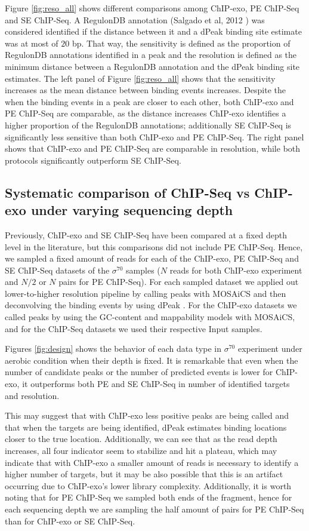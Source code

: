 \documentclass{bmcart}\usepackage[]{graphicx}\usepackage[]{color}
\newcommand{\sig}{\sigma^{70}}
\begin{document}
Figure \ref{fig:reso_all} shows different comparisons among ChIP-exo,
PE ChIP-Seq and SE ChIP-Seq. A RegulonDB annotation (Salgado et al,
2012 \cite{regulondb}) was considered identified if the distance
between it and a dPeak binding site estimate was at most of
$20$ bp. That way, the sensitivity is defined as the
proportion of RegulonDB annotations identified in a peak and the
resolution is defined as the minimum distance between a RegulonDB
annotation and the dPeak binding site estimates. The left panel of
Figure \ref{fig:reso_all} shows that the sensitivity increases as the
mean distance between binding events increases. Despite the when the
binding events in a peak are closer to each other, both ChIP-exo and
PE ChIP-Seq are comparable, as the distance increases ChIP-exo
identifies a higher proportion of the RegulonDB annotations;
additionally SE ChIP-Seq is significantly less sensitive than both
ChIP-exo and PE ChIP-Seq. The right panel shows that ChIP-exo and PE
ChIP-Seq are comparable in resolution, while both protocols
significantly outperform SE ChIP-Seq.

\subsection{Systematic comparison of ChIP-Seq vs ChIP-exo under
  varying sequencing depth}

Previously, ChIP-exo and SE ChIP-Seq have been compared at a fixed
depth level in the literature, but this comparisons did not include PE
ChIP-Seq. Hence, we sampled a fixed amount of reads for each of the
ChIP-exo, PE ChIP-Seq and SE ChIP-Seq datasets of the $\sig$ samples
($N$ reads for both ChIP-exo experiment and $N/2$ or $N$ pairs for PE
ChIP-Seq). For each sampled dataset we applied out lower-to-higher
resolution pipeline by calling peaks with MOSAiCS \cite{mosaics} and
then deconvolving the binding events by using dPeak \cite{dpeak}. For
the ChIP-exo datasets we called peaks by using the GC-content and
mappability models with MOSAiCS, and for the ChIP-Seq datasets we used
their respective Input samples.

Figures \ref{fig:design} shows the behavior of each data type in
$\sig$ experiment under aerobic condition when their depth is
fixed. It is remarkable that even when the number of candidate peaks
or the number of predicted events is lower for ChIP-exo, it
outperforms both PE and SE ChIP-Seq in number of identified targets
and resolution. 

This may suggest that with ChIP-exo less positive peaks are being
called and that when the targets are being identified, dPeak estimates
binding locations closer to the true location. Additionally, we can
see that as the read depth increases, all four indicator seem to
stabilize and hit a plateau, which may indicate that with ChIP-exo a
smaller amount of reads is necessary to identify a higher number of
targets, but it may be also possible that this is an artifact occurring
due to ChIP-exo's lower library complexity. Additionally, it is worth
noting that for PE ChIP-Seq we sampled both ends of the fragment,
hence for each sequencing depth we are sampling the half amount of
pairs for PE ChIP-Seq than for ChIP-exo or SE ChIP-Seq.
\end{document}
